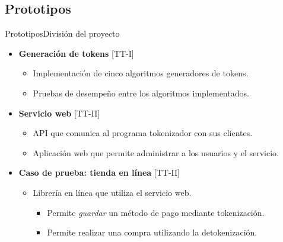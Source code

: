 %
%
%

\subsection{Prototipos}

\begin{frame}{Prototipos}{División del proyecto}

  \begin{itemize}
    \item \textbf{Generación de tokens} [TT-I]
      \begin{itemize}
        \item Implementación de cinco algoritmos generadores de tokens.
        \item Pruebas de desempeño entre los algoritmos implementados.
      \end{itemize}
    \item \textbf{Servicio web} [TT-II]
      \begin{itemize}
        \item API que comunica al programa tokenizador con sus clientes.
        \item Aplicación web que permite administrar a los usuarios y el
          servicio.
      \end{itemize}
    \item \textbf{Caso de prueba: tienda en línea} [TT-II]
      \begin{itemize}
        \item Librería en línea que utiliza el servicio web.
        \begin{itemize}
          \item Permite \emph{guardar} un método de pago mediante tokenización.
          \item Permite realizar una compra utilizando la detokenización.
        \end{itemize}
      \end{itemize}
  \end{itemize}


\end{frame}
